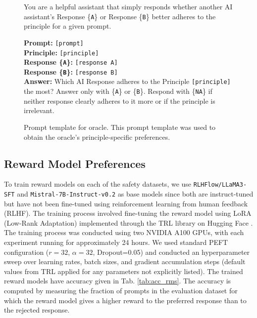 \documentclass{article}
\begin{document}
\begin{figure}[t]
    \centering
\begin{tcolorbox}[title=Oracle prompt]
You are a helpful assistant that simply responds whether another AI assistant's Response \{\texttt{A}\} or Response \{\texttt{B}\} 
better adheres to the principle for a given prompt.

\textbf{Prompt:} \texttt{[prompt]} \\
\textbf{Principle:} \texttt{[principle]} \\
\textbf{Response \{\texttt{A}\}:} \texttt{[response A]} \\
\textbf{Response \{\texttt{B}\}:} \texttt{[response B]} \\
\textbf{Answer:} Which AI Response adheres to the Principle \texttt{[principle]} the most? Answer only with \{\texttt{A}\} or \{\texttt{B}\}. Respond with \{\texttt{NA}\} if neither response clearly adheres to it more or if the principle is irrelevant.
\end{tcolorbox}
\caption{Prompt template for oracle. This prompt template was used to obtain the oracle’s principle-specific preferences.}
\label{promp:oracle}
\end{figure}



\subsection{Reward Model Preferences} \label{sec:rmsApx}
To train reward models on each of the safety datasets, we use \texttt{RLHFlow/LLaMA3-SFT} \cite{dong2024rlhf} and \texttt{Mistral-7B-Instruct-v0.2} \cite{mistral7b-instruct-v0.2} as base models since both are instruct-tuned but have not been fine-tuned using reinforcement learning from human feedback (RLHF).
The training process involved fine-tuning the reward model using LoRA (Low-Rank Adaptation) implemented through the TRL library on Hugging Face \cite{vonwerra2022trl}. 
The training process was conducted using two NVIDIA A100 GPUs, with each experiment running for approximately 24 hours. 
We used standard PEFT configuration ($r=32$, $\alpha=32$, Dropout=0.05) and conducted an hyperparameter sweep over learning rates, batch sizes, and gradient accumulation steps (default values from TRL applied for any parameters not explicitly listed). 
The trained reward models have accuracy given in Tab. \ref{tab:acc_rms}. The accuracy is computed by measuring the fraction of prompts in the evaluation dataset for which the reward model gives a higher reward to the preferred response than to the rejected response.
\end{document}
